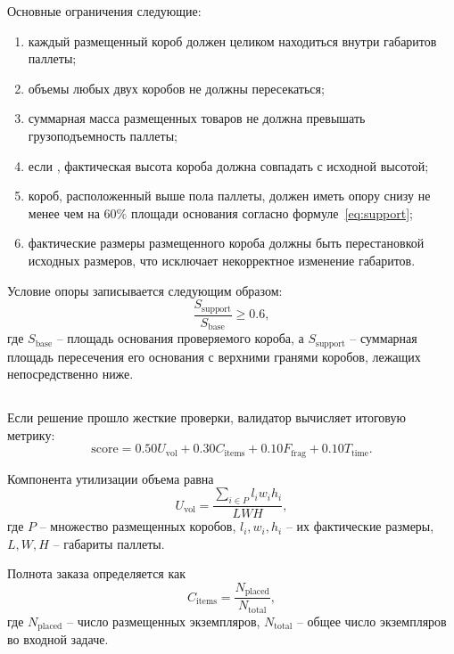 Основные ограничения следующие:
\begin{enumerate}
  \item каждый размещенный короб должен целиком находиться внутри габаритов паллеты;
  \item объемы любых двух коробов не должны пересекаться;
  \item суммарная масса размещенных товаров не должна превышать грузоподъемность паллеты;
  \item если , фактическая высота короба должна совпадать с исходной высотой;
  \item короб, расположенный выше пола паллеты, должен иметь опору снизу не менее чем на 60\% площади основания согласно формуле~\eqref{eq:support};
  \item фактические размеры размещенного короба должны быть перестановкой исходных размеров, что исключает некорректное изменение габаритов.
\end{enumerate}

Условие опоры записывается следующим образом:
\begin{equation}
\frac{S_{\mathrm{support}}}{S_{\mathrm{base}}} \geq 0.6,
\label{eq:support}
\end{equation}
где $S_{\mathrm{base}}$ -- площадь основания проверяемого короба, а $S_{\mathrm{support}}$ -- суммарная площадь пересечения его основания с верхними гранями коробов, лежащих непосредственно ниже.

\subsection{}

Если решение прошло жесткие проверки, валидатор вычисляет итоговую метрику:
\begin{equation}
\mathrm{score}=0.50U_{\mathrm{vol}}+0.30C_{\mathrm{items}}+0.10F_{\mathrm{frag}}+0.10T_{\mathrm{time}}.
\label{eq:score}
\end{equation}

Компонента утилизации объема равна
\begin{equation}
U_{\mathrm{vol}}=\frac{\sum_{i \in P} l_i w_i h_i}{LWH},
\label{eq:volume}
\end{equation}
где $P$ -- множество размещенных коробов, $l_i,w_i,h_i$ -- их фактические размеры, $L,W,H$ -- габариты паллеты.

Полнота заказа определяется как
\begin{equation}
C_{\mathrm{items}}=\frac{N_{\mathrm{placed}}}{N_{\mathrm{total}}},
\label{eq:coverage}
\end{equation}
где $N_{\mathrm{placed}}$ -- число размещенных экземпляров, $N_{\mathrm{total}}$ -- общее число экземпляров во входной задаче.

